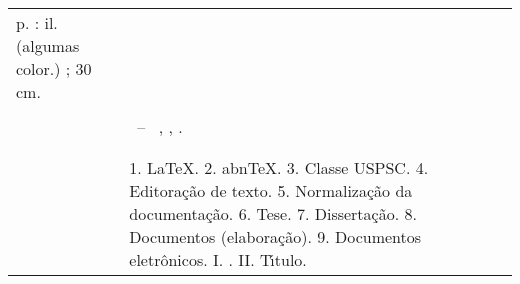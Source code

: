 \begin{fichacatalografica}
\begin{center}
\begin{table}[htb]
\begin{tabular}{|p{0.9cm} p{8.7cm}|}
			\hspace{0.4cm}\pageref{LastPage} p. : il. (algumas color.) ; 30 cm.\\ 
		  & \\
		  & 
		    \hspace{0.4cm}\imprimirnotaficha ~--~ 
						  \imprimirunidademin, 
						  \imprimiruniversidademin, 
		                  \imprimirdata. \\ 
		  & \\                 
		  & \\ 
		  & \hspace{0.4cm}1. LaTeX. 2. abnTeX. 3. Classe USPSC. 4. Editora\c{c}\~ao de texto. 5. Normaliza\c{c}\~ao da documenta\c{c}\~ao. 6. Tese. 7. Disserta\c{c}\~ao. 8. Documentos (elabora\c{c}\~ao). 9. Documentos eletr\^onicos. I. \imprimirorientadorficha. 
		   II. T\'{\i}tulo. \\
	
		  \hline
	\end{tabular}
  \end{table}
\end{center}
\end{fichacatalografica}

